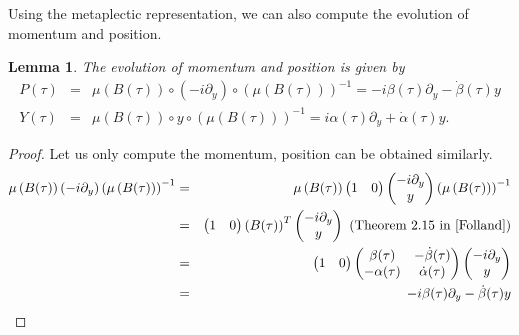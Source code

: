 \documentclass[reqno]{amsart}
\theoremstyle{plain}
\newtheorem{lemma}{Lemma}
\numberwithin{equation}{section}
\begin{document}
Using the metaplectic representation, we can also compute the evolution of
momentum and position.

\begin{lemma}
The evolution of momentum and position is given by\begin{eqnarray*}
P(\tau ) &=&\mu \left( B(\tau )\right) \circ \left( -i\partial _{y}\right)
\circ \left( \mu \left( B(\tau )\right) \right) ^{-1}=-i\beta (\tau
)\partial _{y}-\dot{\beta}(\tau )y \\
Y(\tau ) &=&\mu \left( B(\tau )\right) \circ y\circ \left( \mu \left( B(\tau
)\right) \right) ^{-1}=i\alpha (\tau )\partial _{y}+\dot{\alpha}(\tau )y.
\end{eqnarray*}
\end{lemma}

\begin{proof}
Let us only compute the momentum, position can be obtained similarly.\begin{eqnarray*}
\mu \left( B(\tau )\right) \left( -i\partial _{y}\right) \left( \mu \left(
B(\tau )\right) \right) ^{-1} &=&\mu \left( B(\tau )\right) 
\begin{pmatrix}
1 & 0\end{pmatrix}\begin{pmatrix}
-i\partial _{y} \\ 
y\end{pmatrix}\left( \mu \left( B(\tau )\right) \right) ^{-1} \\
&=&\begin{pmatrix}
1 & 0\end{pmatrix}\left( B(\tau )\right) ^{T}\begin{pmatrix}
-i\partial _{y} \\ 
y\end{pmatrix}\text{ (Theorem 2.15 in \cite{Folland})} \\
&=&\begin{pmatrix}
1 & 0\end{pmatrix}\begin{pmatrix}
\beta (\tau ) & -\dot{\beta}(\tau ) \\ 
-\alpha (\tau ) & \dot{\alpha}(\tau )\end{pmatrix}\begin{pmatrix}
-i\partial _{y} \\ 
y\end{pmatrix}
\\
&=&-i\beta (\tau )\partial _{y}-\dot{\beta}(\tau )y
\end{eqnarray*}
\end{proof}
\end{document}
